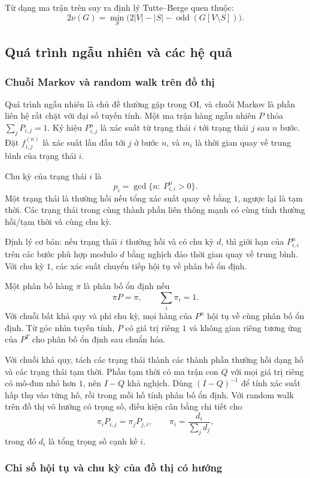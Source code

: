 \documentclass[11pt]{article}
\begin{document}
Từ dạng ma trận trên suy ra định lý Tutte--Berge quen thuộc:
\[
  2\nu(G)=\min_S \bigl(2|V|-|S|-\operatorname{odd}(G[V\setminus S])\bigr).
\]

\subsection{Quá trình ngẫu nhiên và các hệ quả}

\subsubsection{Chuỗi Markov và random walk trên đồ thị}

Quá trình ngẫu nhiên là chủ đề thường gặp trong OI, và chuỗi Markov là phần liên
hệ rất chặt với đại số tuyến tính. Một ma trận hàng ngẫu nhiên $P$ thỏa
$\sum_j P_{i,j}=1$. Ký hiệu $P^n_{i,j}$ là xác suất từ trạng thái $i$ tới trạng
thái $j$ sau $n$ bước. Đặt $f_{i,j}^{(n)}$ là xác suất lần đầu tới $j$ ở bước
$n$, và $m_i$ là thời gian quay về trung bình của trạng thái $i$.

Chu kỳ của trạng thái $i$ là
\[
  p_i=\gcd\{n:\ P^n_{i,i}>0\}.
\]
Một trạng thái là thường hồi nếu tổng xác suất quay về bằng $1$, ngược lại là
tạm thời. Các trạng thái trong cùng thành phần liên thông mạnh có cùng tính
thường hồi/tạm thời và cùng chu kỳ.

Định lý cơ bản: nếu trạng thái $i$ thường hồi và có chu kỳ $d$, thì giới hạn
của $P^n_{i,i}$ trên các bước phù hợp modulo $d$ bằng nghịch đảo thời gian quay
về trung bình. Với chu kỳ $1$, các xác suất chuyển tiếp hội tụ về phân bố ổn
định.

Một phân bố hàng $\pi$ là phân bố ổn định nếu
\[
  \pi P=\pi,\qquad \sum_i\pi_i=1.
\]
Với chuỗi bất khả quy và phi chu kỳ, mọi hàng của $P^n$ hội tụ về cùng phân bố
ổn định. Từ góc nhìn tuyến tính, $P$ có giá trị riêng $1$ và không gian riêng
tương ứng của $P^T$ cho phân bố ổn định sau chuẩn hóa.

Với chuỗi khả quy, tách các trạng thái thành các thành phần thường hồi dạng hố
và các trạng thái tạm thời. Phần tạm thời có ma trận con $Q$ với mọi giá trị riêng
có mô-đun nhỏ hơn $1$, nên $I-Q$ khả nghịch. Dùng $(I-Q)^{-1}$ để tính xác suất
hấp thụ vào từng hố, rồi trong mỗi hố tính phân bố ổn định. Với random walk trên
đồ thị vô hướng có trọng số, điều kiện cân bằng chi tiết cho
\[
  \pi_i P_{i,j}=\pi_jP_{j,i},\qquad
  \pi_i=\frac{d_i}{\sum_j d_j},
\]
trong đó $d_i$ là tổng trọng số cạnh kề $i$.

\subsubsection{Chỉ số hội tụ và chu kỳ của đồ thị có hướng}
\end{document}
